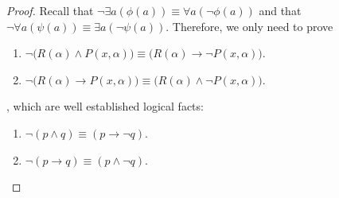 \begin{proof}
	Recall that $\neg\exists a(\phi(a)) \equiv \forall a(\neg \phi(a))$ and that $\neg\forall a(\psi(a)) \equiv \exists a(\neg\psi(a))$. Therefore, we only need to prove
	\begin{enumerate}
		\item $\neg\bigl( R(\alpha) \wedge P(x,\alpha) \bigr) \equiv \bigl( R(\alpha) \to \neg P(x,\alpha) \bigr)$.
		\item $\neg\bigl( R(\alpha) \to P(x,\alpha) \bigr) \equiv \bigl( R(\alpha) \wedge \neg P(x,\alpha) \bigr)$.
	\end{enumerate}
	, which are well established logical facts:
	\begin{enumerate}
		\item $\neg (p \wedge q) \equiv (p \to \neg q)$.
		\item $\neg (p \to q) \equiv (p \wedge \neg q)$.
	\end{enumerate}
\end{proof}


